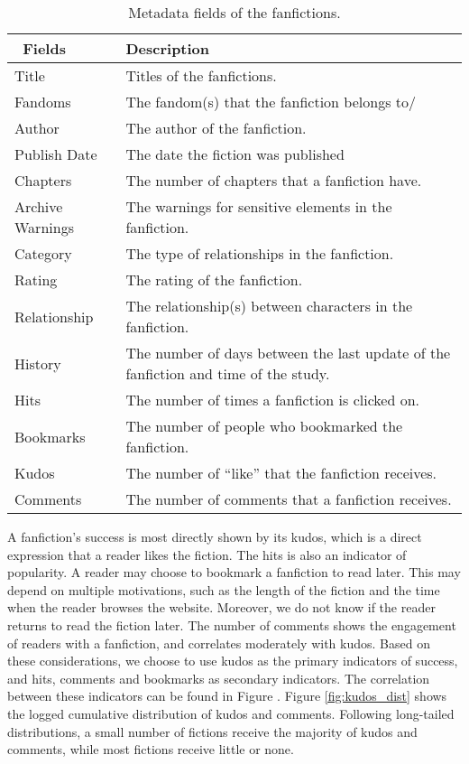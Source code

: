\documentclass[a4paper]{article}
\begin{document}
\begin{table}
\centering
\begin{tabular}[width=0.8\textwidth]{p{3cm}p{10cm}}
\toprule
\ Fields & Description \\ 
   \hline			
Title & Titles of the fanfictions.  \\
Fandoms & The fandom(s) that the fanfiction belongs to/ \\
Author & The author of the fanfiction.  \\
Publish Date & The date the fiction was published \\
Chapters & The number of chapters that a fanfiction have. \\
Archive Warnings & The warnings for sensitive elements in the fanfiction. \\
Category & The type of relationships in the fanfiction. \\
Rating & The rating of the fanfiction. \\
Relationship & The relationship(s) between characters in the fanfiction. \\
History & The number of days between the last update of the fanfiction and time of the study. \\
\hline
Hits & The number of times a fanfiction is clicked on. \\
Bookmarks & The number of people who bookmarked the fanfiction.\\
Kudos & The number of ``like'' that the fanfiction receives. \\
Comments & The number of comments that a fanfiction receives.\\
\bottomrule
\end{tabular}
\caption{Metadata fields of the fanfictions.}
\label{tab:metadata}
\end{table}%

A fanfiction's success is most directly shown by its kudos, which is a direct expression that a reader likes the fiction. The hits is also an indicator of popularity. A reader may choose to bookmark a fanfiction to read later. This may depend on multiple motivations, such as the length of the fiction and the time when the reader browses the website. Moreover, we do not know if the reader returns to read the fiction later. The number of comments shows the engagement of readers with a fanfiction, and correlates moderately with kudos. Based on these considerations, we choose to use kudos as the primary indicators of success, and hits, comments and bookmarks as secondary indicators. The correlation between these indicators can be found in Figure . Figure \ref{fig:kudos_dist} shows the logged cumulative distribution of kudos and comments. Following long-tailed distributions, a small number of fictions receive the majority of kudos and comments, while most fictions receive little or none. 
\end{document}
